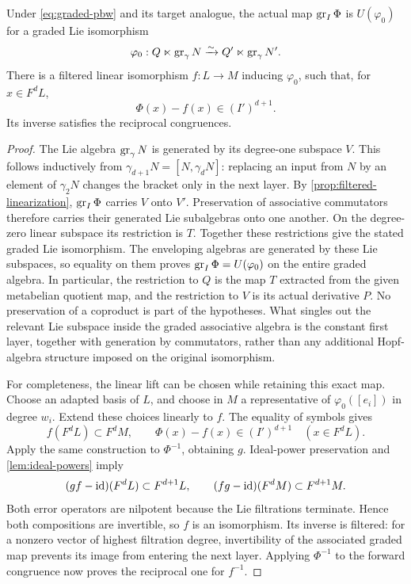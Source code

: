 \begin{proposition}\label{prop:graded-mark}
Under \eqref{eq:graded-pbw} and its target analogue, the actual map
\(\operatorname{gr}_I\Phi\) is \(U(\varphi_0)\) for a graded Lie isomorphism
\[
 \varphi_0:Q\ltimes\operatorname{gr}_\gamma N\xrightarrow{\sim}
       Q'\ltimes\operatorname{gr}_\gamma N'.
\]
There is a filtered linear isomorphism \(f:L\to M\) inducing
\(\varphi_0\), such that, for \(x\in F^dL\),
\[
 \Phi(x)-f(x)\in(I')^{d+1}.
\]
Its inverse satisfies the reciprocal congruences.
\end{proposition}

\begin{proof}
The Lie algebra \(\operatorname{gr}_\gamma N\) is generated by its degree-one
subspace \(V\). This follows inductively from
\(\gamma_{d+1}N=[N,\gamma_dN]\): replacing an input from \(N\)
by an element of \(\gamma_2N\) changes the bracket only in the next
layer. By \cref{prop:filtered-linearization}, \(\operatorname{gr}_I\Phi\)
carries \(V\) onto \(V'\). Preservation of associative commutators
therefore carries their generated Lie subalgebras onto one another.
On the degree-zero linear subspace its restriction is \(T\).
Together these restrictions give the stated graded Lie isomorphism.
The enveloping algebras are generated by these Lie subspaces, so
equality on them proves \(\operatorname{gr}_I\Phi=U(\varphi_0)\) on the entire
graded algebra.
In particular, the restriction to \(Q\) is the map \(T\) extracted
from the given metabelian quotient map, and the restriction to \(V\)
is its actual derivative \(P\). No preservation of a coproduct is
part of the hypotheses. What singles out the relevant Lie subspace
inside the graded associative algebra is the constant first layer,
together with generation by commutators, rather than any additional
Hopf-algebra structure imposed on the original isomorphism.

For completeness, the linear lift can be chosen while retaining
this exact map. Choose an adapted basis of \(L\), and choose in \(M\)
a representative of \(\varphi_0([e_i])\) in degree \(w_i\).
Extend these choices linearly to \(f\). The equality of symbols gives
\[
 f(F^dL)\subset F^dM,\qquad
 \Phi(x)-f(x)\in(I')^{d+1}\quad(x\in F^dL).
\]
Apply the same construction to \(\Phi^{-1}\), obtaining \(g\).
Ideal-power preservation and \cref{lem:ideal-powers} imply
\[
 (gf-\operatorname{id})(F^dL)\subset F^{d+1}L,\qquad
 (fg-\operatorname{id})(F^dM)\subset F^{d+1}M.
\]
Both error operators are nilpotent because the Lie filtrations
terminate. Hence both compositions are invertible, so \(f\) is an
isomorphism. Its inverse is filtered: for a nonzero vector of highest
filtration degree, invertibility of the associated graded map
prevents its image from entering the next layer.
Applying \(\Phi^{-1}\) to the forward congruence now proves the
reciprocal one for \(f^{-1}\).
\end{proof}

